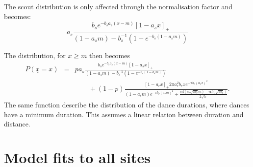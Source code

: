 \documentclass[12pt,letter]{amsart}
\begin{document}
The scout distribution is only affected through the normalisation factor and becomes:
$$
a_s\frac{ b_s e^{-b_s a_s (x-m)}  \left[ 1-a_s x\right]_+ }
{\left(1-a_s m\right)-b_s^{-1}\left(1-e^{-b_s\left(1-a_s m\right)}\right)}$$

The distribution, for $ x \ge m$ then becomes
\begin{eqnarray*}P(\underline x= x )&=&pa_s\frac{ b_s e^{-b_s a_s (x-m)}  \left[ 1-a_s x\right]_+ }
{\left(1-a_s m\right)-b_s^{-1}\left(1-e^{-b_s\left(1-a_s m\right)}\right)}\\&& \qquad +(1-p) \frac{\left[1- a_r x\right]_+2 \pi a_r^2 b_r  x e^{- \pi  b_r (a_r x)^2}}{\left(1-a_r m\right)e^{-\pi b_r (a_r m)^2 }+\frac{\text{erf}\left(a_r \sqrt{\pi b_r}m \right)-\text{erf}\left(\sqrt{\pi b_r}\right)}{2 \sqrt{b_r}}}.
\end{eqnarray*}
The same function describe the distribution of the dance durations, where dances have a minimum duration. This assumes a linear relation between duration and distance.

\section*{Model fits to all sites}



\vspace*{50px}
\end{document}
